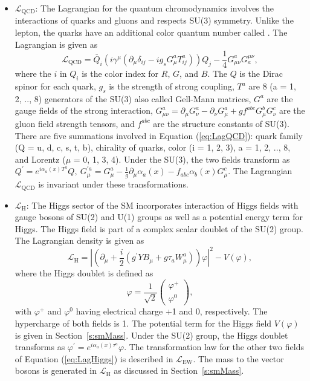 \begin{itemize} [leftmargin=*]
\item \textbf{$\mathcal{L}_\text{QCD}$}: The Lagrangian for the quantum
chromodynamics involves the interactions of quarks and gluons and 
respects SU(3) symmetry. Unlike the lepton, the quarks have an additional 
color quantum number called . The Lagrangian is given as
\begin{equation}
\mathcal{L}_\text{QCD} = \bar Q_{i} \left( i\gamma^\mu(
\partial_\mu\delta_{ij} - i g_s G_\mu^a T^a_{ij})\right) Q_j
- \frac{1}{4} G^a_{\mu\nu} G^{\mu\nu}_a,
\label{eq:LagQCD}
\end{equation}
where the $i$ in $Q_i$ is the color index for $R$, $G$, and $B$. The $Q$ is
the Dirac spinor for each quark, $g_s$ is the strength
of strong coupling, $T^a$ are 8 (a = 1, 2, .., 8) generators of the SU(3)
also called Gell-Mann matrices, $G^a$ are the gauge fields of the strong 
interaction, $G_{\mu\nu}^a = \partial_\mu G_\nu^a - \partial_\nu G_\mu^a + g 
f^{abc}G_\mu^bG_\nu^c$ are the gluon field strength tensors, and $f^{abc}$ 
are the structure constants of SU(3). There are five summations involved
in Equation (\ref{eq:LagQCD}): quark family (Q = u, d, c, s, t, b), 
chirality of quarks, color (i = 1, 2, 3), a = 1, 2, .., 8, and
Lorentz ($\mu$ = 0, 1, 3, 4). Under the SU(3), the two fields transform as 
$Q^\prime = e^{i\alpha_a(x)T^a }Q, ~G_\mu^{\prime a} = G_\mu^a - 
\frac{1}{g}\partial_\mu\alpha_a(x) - f_{abc}\alpha_b(x) G^c_\mu$. The 
Lagrangian $\mathcal{L}_\text{QCD}$ is invariant under these transformations.

\item \textbf{$\mathcal{L}_\text{H}$}: The Higgs sector of the SM incorporates
				interaction of Higgs fields with gauge bosons of SU(2) and U(1) groups
				as well as a potential energy term for Higgs. The Higgs field is part 
				of a complex scalar doublet of the SU(2) group. The Lagrangian density is 
				given as
				\begin{equation}
				\mathcal{L}_\text{H} = \left|\left(\partial_\mu + \frac{i}{2} \left( 
								g^\prime Y B_\mu + g \tau_a W_\mu^a \right)\right)\varphi
								\right|^2 - V(\varphi), 
				\label{eq:LagHiggs}
				\end{equation}
				where the Higgs doublet is defined as
				\begin{equation}
				\varphi = \frac{1}{\sqrt 2} \left(\begin{array}{c}\varphi^+ \\ 
				\varphi^0\end{array}\right),
				\end{equation}
				with $\varphi^+$ and $\varphi^0$ having electrical charge +1 and 0, 
respectively. 
				The hypercharge of both fields is 1. The potential term for the Higgs 
				field $V(\varphi)$ is given in Section~\ref{s:smMass}. Under the SU(2)
				group, the Higgs doublet transforms as $\varphi^\prime = e^{i\alpha_a(x)
				\tau^a}\varphi$. The transformation law for the other two fields of 
				Equation (\ref{eq:LagHiggs}) is described in $\mathcal{L}_\text{EW}$. 
				The mass to the vector bosons is generated in $\mathcal{L}_\text{H}$ as
				discussed in Section~\ref{s:smMass}.


\end{itemize}
